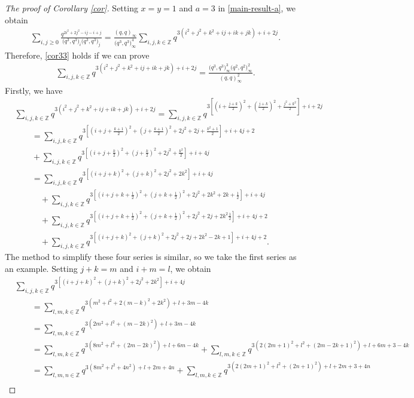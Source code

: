 \documentclass[10pt,a4paper]{amsart}
\numberwithin{equation}{section}
\theoremstyle{definition}
\begin{document}
\begin{proof}[The proof of Corollary \ref{cor}]
Setting $x=y=1$ and $a=3$ in \eqref{main-result-a}, we obtain
\begin{align*}
\sum_{i,j\geq0}\frac{q^{2i^2+2j^2-ij-i+j}}{\bigl(q^3,q^3\bigr)_i\bigl(q^3,q^3\bigr)_j} =\frac{(q,q)_{\infty}}{\bigl(q^3,q^3\bigr)^4_{\infty}}\sum_{i,j,k\in\mathbb{Z}}q^{3(i^2+j^2+k^2+ij+ik+jk)+i+2j}.
\end{align*}
Therefore, \eqref{cor33} holds if we can prove
\begin{align}\label{key-33}
\sum_{i,j,k\in\mathbb{Z}}q^{3(i^2+j^2+k^2+ij+ik+jk)+i+2j}=\frac{\bigl(q^3,q^3\bigr)^3_{\infty} \bigl(q^2,q^2\bigr)^2_{\infty}}{(q,q)^2_{\infty}}.
\end{align}
Firstly, we have
\begin{align*}
&\sum_{i,j,k\in\mathbb{Z}}q^{3(i^2+j^2+k^2+ij+ik+jk)+i+2j}=\sum_{i,j,k\in\mathbb{Z}}q^{3[(i+\frac{j+k}{2})^2+(\frac{j+k}{2})^2+\frac{j^2+k^2}{2}]+i+2j}\\
& \qquad =\sum_{i,j,k\in\mathbb{Z}}q^{3[(i+j+\frac{k+1}{2})^2+(j+\frac{k+1}{2})^2+2j^2+2j+\frac{k^2+1}{2}]+i+4j+2} \\ & \qquad +\sum_{i,j,k\in\mathbb{Z}}q^{3[(i+j+\frac{k}{2})^2+(j+\frac{k}{2})^2+2j^2+\frac{k^2}{2}]+i+4j}\\
& \qquad =\sum_{i,j,k\in\mathbb{Z}}q^{3[(i+j+k)^2+(j+k)^2+2j^2+2k^2]+i+4j} \\
& \qquad\quad{} +\sum_{i,j,k\in\mathbb{Z}}q^{3[(i+j+k+\frac{1}{2})^2+(j+k+\frac{1}{2})^2+2j^2+2k^2+2k+\frac{1}{2}]+i+4j}\\
&\qquad\quad{} +\sum_{i,j,k\in\mathbb{Z}}q^{3[(i+j+k+\frac{1}{2})^2+(j+k+\frac{1}{2})^2+2j^2+2j+2k^2\frac{1}{2}]+i+4j+2}\\
&\qquad\quad{} +\sum_{i,j,k\in\mathbb{Z}}q^{3[(i+j+k)^2+(j+k)^2+2j^2+2j+2k^2-2k+1]+i+4j+2}.
\end{align*}
The method to simplify these four series is similar, so we take the first series as an example. Setting $j+k=m$ and $i+m=l$, we obtain
\begin{align*}
&\sum_{i,j,k\in\mathbb{Z}}q^{3[(i+j+k)^2+(j+k)^2+2j^2+2k^2]+i+4j}\\
& \qquad =\sum_{l,m,k\in\mathbb{Z}}q^{3(m^2+l^2+2(m-k)^2+2k^2)+l+3m-4k} \\
& \qquad =\sum_{l,m,k\in\mathbb{Z}}q^{3(2m^2+l^2+(m-2k)^2)+l+3m-4k}\\
& \qquad =\sum_{l,m,k\in\mathbb{Z}}q^{3(8m^2+l^2+(2m-2k)^2)+l+6m-4k}+\sum_{l,m,k\in\mathbb{Z}}q^{3(2(2m+1)^2+l^2+(2m-2k+1)^2)+l+6m+3-4k}\\
& \qquad =\sum_{l,m,n\in\mathbb{Z}}q^{3(8m^2+l^2+4n^2)+l+2m+4n}+\sum_{l,m,k\in\mathbb{Z}}q^{3(2(2m+1)^2+l^2+(2n+1)^2)+l+2m+3+4n}\\

\end{align*}
\end{proof}
\end{document}
